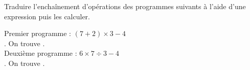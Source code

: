 \begin{exercice}%
    Traduire l'enchaînement d'opérations des programmes suivants à l'aide d'une expression puis les calculer.
    \begin{multicols}{2}
    \end{multicols}
 \end{exercice}
 
 \begin{corrige}
    Premier programme : {\blue $(7 + 2)\times3-4$} \\ [1mm]
    . On trouve {}. \\
    Deuxième programme :  {\blue $6\times7\div3-4$} \\ [1mm]
    . On trouve {}.
 \end{corrige}